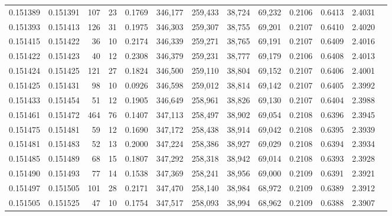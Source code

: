 \begin{tabular}{rrrrrrrrrrrrr}
0.151389 & 0.151391 &   107 &  23 &                                     0.1769 & 346,177 & 259,433 &  38,724 &  69,232 & 0.2106 & 0.6413 & 2.4031 \\
0.151393 & 0.151413 &   126 &  31 &                                     0.1975 & 346,303 & 259,307 &  38,755 &  69,201 & 0.2107 & 0.6410 & 2.4020 \\
0.151415 & 0.151422 &    36 &  10 &                                     0.2174 & 346,339 & 259,271 &  38,765 &  69,191 & 0.2107 & 0.6409 & 2.4016 \\
0.151422 & 0.151423 &    40 &  12 &                                     0.2308 & 346,379 & 259,231 &  38,777 &  69,179 & 0.2106 & 0.6408 & 2.4013 \\
0.151424 & 0.151425 &   121 &  27 &                                     0.1824 & 346,500 & 259,110 &  38,804 &  69,152 & 0.2107 & 0.6406 & 2.4001 \\
0.151425 & 0.151431 &    98 &  10 &                                     0.0926 & 346,598 & 259,012 &  38,814 &  69,142 & 0.2107 & 0.6405 & 2.3992 \\
0.151433 & 0.151454 &    51 &  12 &                                     0.1905 & 346,649 & 258,961 &  38,826 &  69,130 & 0.2107 & 0.6404 & 2.3988 \\
0.151461 & 0.151472 &   464 &  76 &                                     0.1407 & 347,113 & 258,497 &  38,902 &  69,054 & 0.2108 & 0.6396 & 2.3945 \\
0.151475 & 0.151481 &    59 &  12 &                                     0.1690 & 347,172 & 258,438 &  38,914 &  69,042 & 0.2108 & 0.6395 & 2.3939 \\
0.151481 & 0.151483 &    52 &  13 &                                     0.2000 & 347,224 & 258,386 &  38,927 &  69,029 & 0.2108 & 0.6394 & 2.3934 \\
0.151485 & 0.151489 &    68 &  15 &                                     0.1807 & 347,292 & 258,318 &  38,942 &  69,014 & 0.2108 & 0.6393 & 2.3928 \\
0.151490 & 0.151493 &    77 &  14 &                                     0.1538 & 347,369 & 258,241 &  38,956 &  69,000 & 0.2109 & 0.6391 & 2.3921 \\
0.151497 & 0.151505 &   101 &  28 &                                     0.2171 & 347,470 & 258,140 &  38,984 &  68,972 & 0.2109 & 0.6389 & 2.3912 \\
0.151505 & 0.151525 &    47 &  10 &                                     0.1754 & 347,517 & 258,093 &  38,994 &  68,962 & 0.2109 & 0.6388 & 2.3907 \\

\end{tabular}
